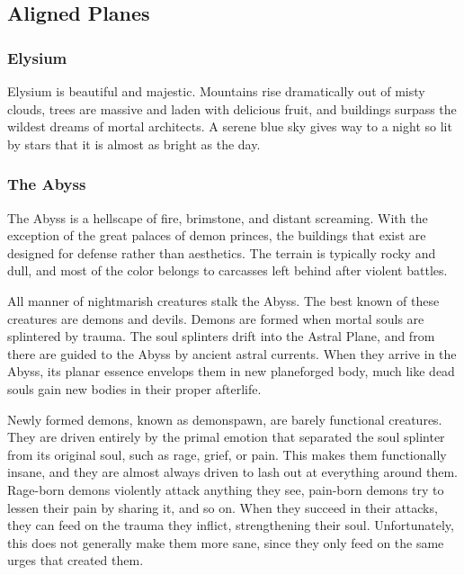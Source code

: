   \subsection{Aligned Planes}\label{Aligned Planes}

    \subsubsection{Elysium}
      Elysium is beautiful and majestic.
      Mountains rise dramatically out of misty clouds, trees are massive and laden with delicious fruit, and buildings surpass the wildest dreams of mortal architects.
      A serene blue sky gives way to a night so lit by stars that it is almost as bright as the day.

    \subsubsection{The Abyss}
      The Abyss is a hellscape of fire, brimstone, and distant screaming.
      With the exception of the great palaces of demon princes, the buildings that exist are designed for defense rather than aesthetics.
      The terrain is typically rocky and dull, and most of the color belongs to carcasses left behind after violent battles.

      All manner of nightmarish creatures stalk the Abyss.
      The best known of these creatures are demons and devils.
      Demons are formed when mortal souls are splintered by trauma.
      The soul splinters drift into the Astral Plane, and from there are guided to the Abyss by ancient astral currents.
      When they arrive in the Abyss, its planar essence envelops them in new planeforged body, much like dead souls gain new bodies in their proper afterlife.

      Newly formed demons, known as demonspawn, are barely functional creatures.
      They are driven entirely by the primal emotion that separated the soul splinter from its original soul, such as rage, grief, or pain.
      This makes them functionally insane, and they are almost always driven to lash out at everything around them.
      Rage-born demons violently attack anything they see, pain-born demons try to lessen their pain by sharing it, and so on.
      When they succeed in their attacks, they can feed on the trauma they inflict, strengthening their soul.
      Unfortunately, this does not generally make them more sane, since they only feed on the same urges that created them.

